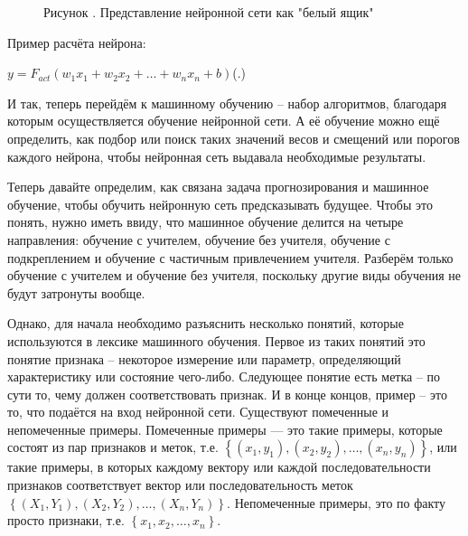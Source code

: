 {	\begin{figure}[H]
		\centering
		\def\svgwidth{\textwidth}
		
		\caption*{\gostFont Рисунок \thechaptercntr .\theimagecntr \spc {--} Представление нейронной сети как "белый ящик"}
		\label{fig:Neuron}
	\end{figure} \addtocounter{imagecntr}{1}
	
	\par \redline Пример расчёта нейрона:
	
		\formulaspace \par \redline 
	$y = F_{act}\left(w_1x_1 + w_2x_2 + \dots + w_nx_n + b\right)$\hfill (\thechaptercntr .\theformulacntr) \redline
	\formulaspace \addtocounter{formulacntr}{1}
	
	\par \redline И так, теперь перейдём к машинному обучению – набор алгоритмов, благодаря которым осуществляется обучение нейронной сети. А её обучение можно ещё определить, как подбор или поиск таких значений весов и смещений или порогов каждого нейрона, чтобы нейронная сеть выдавала необходимые результаты. 
	
	\par \redline Теперь давайте определим, как связана задача прогнозирования и машинное обучение, чтобы обучить нейронную сеть предсказывать будущее. Чтобы это понять, нужно иметь ввиду, что машинное обучение делится на четыре направления: обучение с учителем, обучение без учителя, обучение с подкреплением и обучение с частичным привлечением учителя. Разберём только обучение с учителем и обучение без учителя, поскольку другие виды обучения не будут затронуты вообще. 
	
	\par \redline Однако, для начала необходимо разъяснить несколько понятий, которые используются в лексике машинного обучения. Первое из таких понятий это понятие признака – некоторое измерение или параметр, определяющий характеристику или состояние чего-либо. Следующее понятие есть метка – по сути то, чему должен соответствовать признак.  И в конце концов, пример – это то, что подаётся на вход нейронной сети. Существуют помеченные и непомеченные примеры. Помеченные примеры — это такие примеры, которые состоят из пар признаков и меток, т.е. $\left\{\left(x_{1}, y_{1}\right), \left(x_{2}, y_{2}\right), \dots, \left(x_{n}, y_{n}\right)\right\}$, или такие примеры, в которых каждому вектору или каждой последовательности признаков соответствует вектор или последовательность меток $\left\{\left(X_{1}, Y_{1}\right), \left(X_{2}, Y_{2}\right), \dots, \left(X_{n}, Y_{n}\right)\right\}$. Непомеченные примеры, это по факту просто признаки, т.е. $\left\{x_{1}, x_{2}, \dots, x_{n}\right\}$. 
	
}
